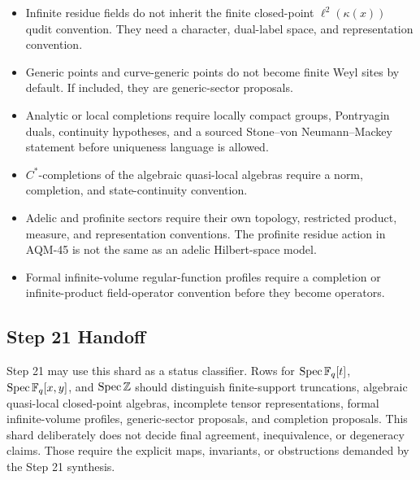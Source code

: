 \begin{itemize}
\item Infinite residue fields do not inherit the finite closed-point
  \(\ell^2(\kappa(x))\) qudit convention.  They need a character, dual-label
  space, and representation convention.
\item Generic points and curve-generic points do not become finite Weyl sites
  by default.  If included, they are generic-sector proposals.
\item Analytic or local completions require locally compact groups,
  Pontryagin duals, continuity hypotheses, and a sourced Stone--von
  Neumann--Mackey statement before uniqueness language is allowed.
\item \(C^*\)-completions of the algebraic quasi-local algebras require a
  norm, completion, and state-continuity convention.
\item Adelic and profinite sectors require their own topology, restricted
  product, measure, and representation conventions.  The profinite residue
  action in AQM-45 is not the same as an adelic Hilbert-space model.
\item Formal infinite-volume regular-function profiles require a completion
  or infinite-product field-operator convention before they become operators.
\end{itemize}

\subsection{Step 21 Handoff}

Step 21 may use this shard as a status classifier.  Rows for
\(\operatorname{Spec}\mathbb F_q[t]\), \(\operatorname{Spec}\mathbb F_q[x,y]\), and \(\operatorname{Spec}\mathbb Z\)
should distinguish finite-support truncations, algebraic quasi-local
closed-point algebras, incomplete tensor representations, formal
infinite-volume profiles, generic-sector proposals, and completion proposals.
This shard deliberately does not decide final agreement, inequivalence, or
degeneracy claims.  Those require the explicit maps, invariants, or
obstructions demanded by the Step 21 synthesis.
